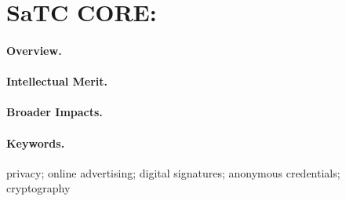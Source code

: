 \section*{SaTC CORE: \proptitle{}}
\label{sec:summary}

\paragraph{Overview.}
%

\paragraph{Intellectual Merit.}
%
%


\paragraph{Broader Impacts.}
%
%
%

\paragraph{Keywords.} privacy; online advertising; digital signatures; anonymous credentials; cryptography
